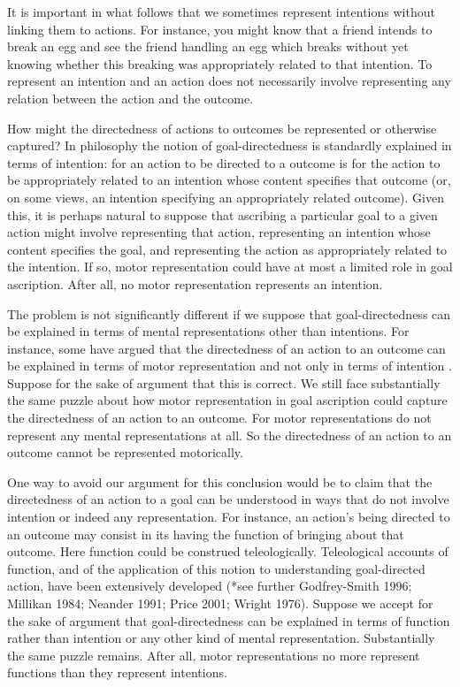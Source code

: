 \documentclass[12pt,\papersize]{extarticle}
\begin{document}
It is important in what follows that we sometimes represent intentions without linking them to actions.  For instance, you might know that a friend intends to break an egg and see the friend handling an egg which breaks without yet knowing whether this breaking was appropriately related to that intention.  To represent an intention and an action does not necessarily involve representing any relation between the action and the outcome.

How might the directedness of actions to outcomes be represented or otherwise captured? In philosophy the notion of goal-directedness is standardly explained in terms of intention: for an action to be directed to a outcome is for the action to be appropriately related to an intention whose content specifies that outcome (or, on some views, an intention specifying an appropriately related outcome). Given this, it is perhaps natural to suppose that ascribing a particular goal to a given action might involve representing that action, representing an intention whose content specifies the goal, and representing the action as appropriately related to the intention.  If so, motor representation could have at most a limited role in goal ascription.  After all, no motor representation represents an intention.

The problem is not significantly different if we suppose that goal-directedness can be explained in terms of mental representations other than intentions.  For instance, some have argued that the directedness of an action to an outcome can be explained in terms of motor representation and not only in terms of intention \citep{butterfill:2012_intention}.  Suppose for the sake of argument that this is correct. We still face substantially the same puzzle about how motor representation in goal ascription could capture the directedness of an action to an outcome.  For motor representations do not represent any mental representations at all.  So the directedness of an action to an outcome cannot be represented motorically.

One way to avoid our argument for this conclusion would be to claim that the directedness of an action to a goal can be understood in ways that do not involve intention or indeed any representation.  For instance, an action's being directed to an outcome may consist in its having the function of bringing about that outcome. Here function could be construed teleologically. Teleological accounts of function, and of the application of this notion to understanding goal-directed action, have been extensively developed (*see further Godfrey-Smith 1996; Millikan 1984; Neander 1991; Price 2001; Wright 1976). Suppose we accept for the sake of argument  that goal-directedness can be explained in terms of function rather than intention or any other kind of mental representation.  Substantially the same puzzle remains. After all, motor representations no more represent functions than they represent intentions.
\end{document}
